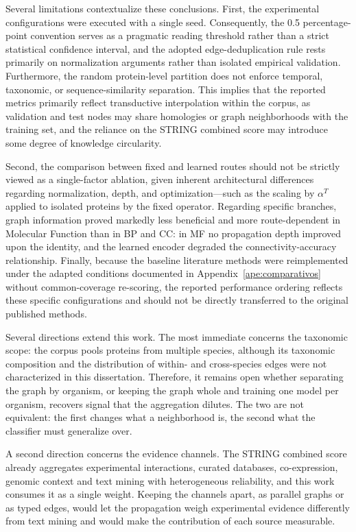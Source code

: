 \documentclass[Ingles]{ic-tese-v3}
\begin{document}
\begin{description}
\end{description}

Several limitations contextualize these conclusions. First, the experimental configurations were executed with a single seed. Consequently, the 0.5 percentage-point convention serves as a pragmatic reading threshold rather than a strict statistical confidence interval, and the adopted edge-deduplication rule rests primarily on normalization arguments rather than isolated empirical validation. Furthermore, the random protein-level partition does not enforce temporal, taxonomic, or sequence-similarity separation. This implies that the reported metrics primarily reflect transductive interpolation within the corpus, as validation and test nodes may share homologies or graph neighborhoods with the training set, and the reliance on the STRING combined score may introduce some degree of knowledge circularity.

Second, the comparison between fixed and learned routes should not be strictly viewed as a single-factor ablation, given inherent architectural differences regarding normalization, depth, and optimization---such as the scaling by $\alpha^T$ applied to isolated proteins by the fixed operator.  Regarding specific branches, graph information proved markedly less beneficial and more route-dependent in Molecular Function than in BP and CC: in MF no propagation depth improved upon the identity, and the learned encoder degraded the connectivity-accuracy relationship. Finally, because the baseline literature methods were reimplemented under the adapted conditions documented in Appendix~\ref{ape:comparativos} without common-coverage re-scoring, the reported performance ordering reflects these specific configurations and should not be directly transferred to the original published methods.

Several directions extend this work. The most immediate concerns the taxonomic scope: the corpus pools proteins from multiple species, although its taxonomic composition and the distribution of within- and cross-species edges were not characterized in this dissertation. Therefore, it remains open whether separating
the graph by organism, or keeping the graph whole and training one model per organism,
recovers signal that the aggregation dilutes. The two are not equivalent: the first changes
what a neighborhood is, the second what the classifier must generalize over.

A second direction concerns the evidence channels. The STRING combined score already
aggregates experimental interactions, curated databases, co-expression, genomic context and
text mining with heterogeneous reliability, and this work consumes it as a single weight.
Keeping the channels apart, as parallel graphs or as typed edges, would let the propagation
weigh experimental evidence differently from text mining and would make the contribution of
each source measurable.
\end{document}
